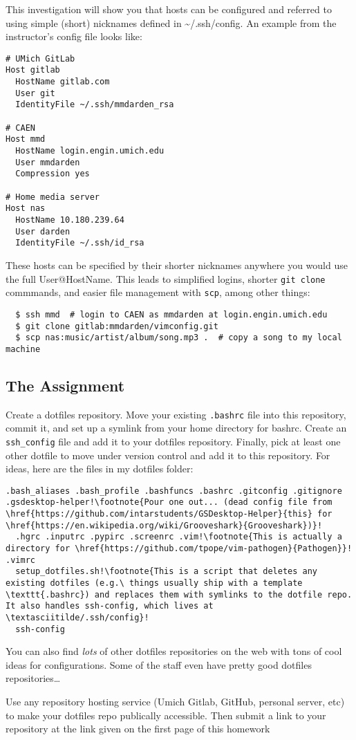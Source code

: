 \documentclass{article}
\begin{document}
This investigation will show you that hosts can be configured and referred to
using simple (short) nicknames defined in \textasciitilde/.ssh/config. An
example from the instructor's config file looks like:

\begin{lstlisting}
# UMich GitLab
Host gitlab
  HostName gitlab.com
  User git
  IdentityFile ~/.ssh/mmdarden_rsa

# CAEN
Host mmd
  HostName login.engin.umich.edu
  User mmdarden
  Compression yes
  
# Home media server
Host nas
  HostName 10.180.239.64
  User darden
  IdentityFile ~/.ssh/id_rsa
\end{lstlisting}

These hosts can be specified by their shorter nicknames anywhere you would
use the full User@HostName. This leads to simplified logins, shorter
\texttt{git clone} commmands, and easier file management with \texttt{scp},
among other things:

\begin{lstlisting}
  $ ssh mmd  # login to CAEN as mmdarden at login.engin.umich.edu
  $ git clone gitlab:mmdarden/vimconfig.git
  $ scp nas:music/artist/album/song.mp3 .  # copy a song to my local machine
\end{lstlisting}
  

\subsection*{The Assignment}
Create a dotfiles repository. Move your existing \texttt{.bashrc} file into
this repository, commit it, and set up a symlink from your home directory for
bashrc. Create an \texttt{ssh\_config} file and add it to your dotfiles
repository. Finally, pick at least one other dotfile to move under version
control and add it to this repository. For ideas, here are the files in my
dotfiles folder:

\begin{lstlisting}[escapechar=!]
  .bash_aliases .bash_profile .bashfuncs .bashrc .gitconfig .gitignore .gsdesktop-helper!\footnote{Pour one out... (dead config file from \href{https://github.com/intarstudents/GSDesktop-Helper}{this} for \href{https://en.wikipedia.org/wiki/Grooveshark}{Grooveshark})}!
  .hgrc .inputrc .pypirc .screenrc .vim!\footnote{This is actually a directory for \href{https://github.com/tpope/vim-pathogen}{Pathogen}}!  .vimrc
  setup_dotfiles.sh!\footnote{This is a script that deletes any existing dotfiles (e.g.\ things usually ship with a template \texttt{.bashrc}) and replaces them with symlinks to the dotfile repo. It also handles ssh-config, which lives at \textasciitilde/.ssh/config}!
  ssh-config
\end{lstlisting}

You can also find \emph{lots} of other dotfiles repositories on the web with
tons of cool ideas for configurations. Some of the staff even have pretty good
dotfiles repositories\dots

Use any repository hosting service (Umich Gitlab, GitHub, personal server,
etc) to make your dotfiles repo publically accessible. Then submit a link to
your repository at the link given on the first page of this homework
\end{document}
